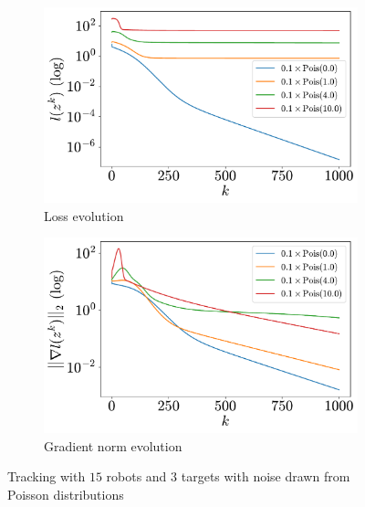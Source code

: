 \documentclass[a4paper,11pt,oneside]{book}
\begin{document}
\begin{figure}[htb!]
      \centering
      \begin{subfigure}[t]{0.46\linewidth}
            \centering
            \includegraphics[width=\linewidth]{./figs/tracking/poisson/loss.pdf} 
            \caption{Loss evolution}
      \end{subfigure}
      \hfill
      \begin{subfigure}[t]{0.46\linewidth}
            \centering
            \includegraphics[width=\linewidth]{./figs/tracking/poisson/gradient.pdf} 
            \caption{Gradient norm evolution}
      \end{subfigure}
      \caption{Tracking with $15$ robots and $3$ targets with noise drawn from Poisson distributions}
      \label{fig:tracking_poisson_15_3}
\end{figure}
\end{document}
